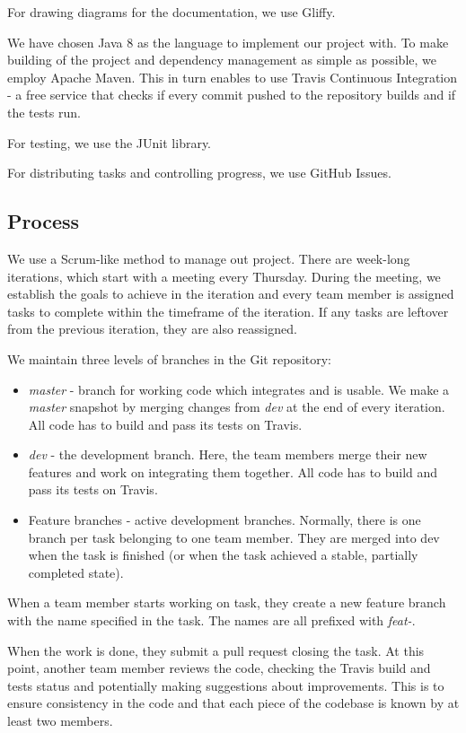 \documentclass[a4paper,12pt]{article}
\begin{document}
For drawing diagrams for the documentation, we use Gliffy.

We have chosen Java 8 as the language to implement our project with. To make building of the project and dependency management as simple as possible, we employ Apache Maven. This in turn enables to use Travis Continuous Integration - a free service that checks if every commit pushed to the repository builds and if the tests run.

For testing, we use the JUnit library.

For distributing tasks and controlling progress, we use GitHub Issues.

\subsection{Process}
We use a Scrum-like method to manage out project. There are week-long iterations, which start with a meeting every Thursday. During the meeting, we establish the goals to achieve in the iteration and every team member is assigned tasks to complete within the timeframe of the iteration. If any tasks are leftover from the previous iteration, they are also reassigned.

We maintain three levels of branches in the Git repository:
\begin{itemize}
    \item{\emph{master} - branch for working code which integrates and is usable. We make a \emph{master} snapshot by merging changes from \emph{dev} at the end of every iteration. All code has to build and pass its tests on Travis.}
    \item{\emph{dev} - the development branch. Here, the team members merge their new features and work on integrating them together. All code has to build and pass its tests on Travis.}
    \item{Feature branches - active development branches. Normally, there is one branch per task belonging to one team member. They are merged into dev when the task is finished (or when the task achieved a stable, partially completed state).}
\end{itemize}

When a team member starts working on task, they create a new feature branch with the name specified in the task. The names are all prefixed with \emph{feat-}. 

When the work is done, they submit a pull request closing the task. At this point, another team member reviews the code, checking the Travis build and tests status and potentially making suggestions about improvements. This is to ensure consistency in the code and that each piece of the codebase is known by at least two members.
\end{document}
